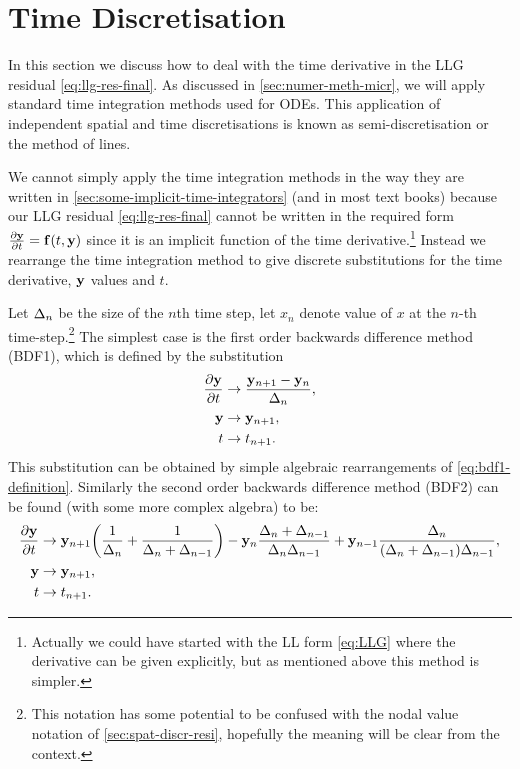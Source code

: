 \section{Time Discretisation}
\label{sec:time-discretisation-resi}

In this section we discuss how to deal with the time derivative in the LLG residual \cref{eq:llg-res-final}.
As discussed in \cref{sec:numer-meth-micr}, we will apply standard time integration methods used for ODEs.
This application of independent spatial and time discretisations is known as semi-discretisation or the method of lines.

We cannot simply apply the time integration methods in the way they are written in \cref{sec:some-implicit-time-integrators} (and in most text books) because our LLG residual \cref{eq:llg-res-final} cannot be written in the required form $\frac{\partial \mathbf{y}}{\partial t} = {\mathbf{f}}(t, \mathbf{y})$ since it is an implicit function of the time derivative.\footnote{Actually we could have started with the LL form \cref{eq:LLG} where the derivative can be given explicitly, but as mentioned above this method is simpler.}
Instead we rearrange the time integration method to give discrete substitutions for the time derivative, $\mathbf{y}$ values and $t$.

Let $\Delta_{n}$ be the size of the $n$th time step, let $x_n$ denote value of $x$ at the $n$-th time-step.\footnote{This notation has some potential to be confused with the nodal value notation of \cref{sec:spat-discr-resi}, hopefully the meaning will be clear from the context.}
The simplest case is the first order backwards difference method (BDF1), which is defined by the substitution
\begin{equation}
  \begin{aligned}
    \frac{\partial \mathbf{y}}{\partial t} &\rightarrow \frac{\mathbf{y}_{n+1} - \mathbf{y}_n}{\Delta_{n}}, \\
    \mathbf{y} &\rightarrow \mathbf{y}_{n+1}, \\
    t &\rightarrow t_{n+1}.
    \label{eq:impl-bdf1}
  \end{aligned}
\end{equation}
This substitution can be obtained by simple algebraic rearrangements of \cref{eq:bdf1-definition}.
Similarly the second order backwards difference method (BDF2) can be found (with some more complex algebra) to be:
\begin{equation}
  \begin{aligned}
    \frac{\partial \mathbf{y}}{\partial t} &\rightarrow \mathbf{y}_{n+1}{\left( \frac{1}{\Delta_{n}} + \frac{1}{\Delta_{n} + \Delta_{n-1}} \right)}
    - \mathbf{y}_n \frac{\Delta_{n} + \Delta_{n-1}}{\Delta_{n}\Delta_{n-1}}
    + \mathbf{y}_{n-1} \frac{\Delta_{n}}{(\Delta_{n} + \Delta_{n-1})\Delta_{n-1}}, \\
    \mathbf{y} &\rightarrow \mathbf{y}_{n+1}, \\
    t &\rightarrow t_{n+1}.
    \label{eq:impl-bdf2}
  \end{aligned}
\end{equation}

